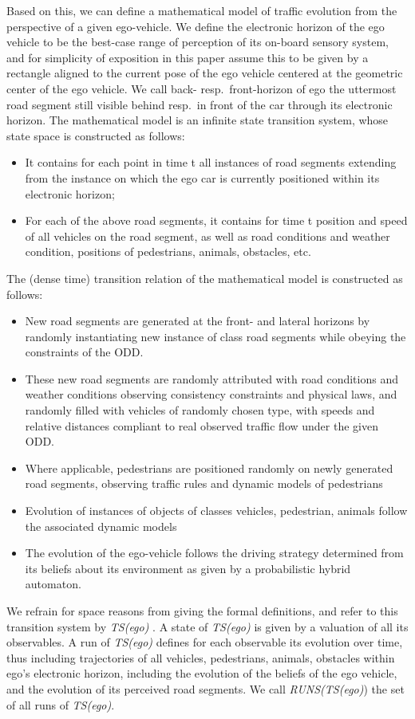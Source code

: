 Based on this, we can define a mathematical model of traffic evolution from the perspective of a given ego-vehicle. We define the electronic horizon of the ego vehicle to be the best-case range of perception of its on-board sensory system, and for simplicity of exposition in this paper assume this to be given by a rectangle aligned to the current pose of the ego vehicle centered at the geometric center of the ego vehicle. We call back- resp.\  front-horizon of ego the uttermost road segment still visible behind resp.\ in front of the car through its electronic horizon. The mathematical model is an infinite state transition system, whose state space is constructed as follows:
\begin{itemize}
\item It contains for each point in time t  all instances of road segments extending from the instance on which the ego car is currently positioned within its electronic horizon;
\item For each of the above road segments, it contains for time t  position and speed of all vehicles on the road segment, as well as road conditions and weather condition, positions of pedestrians, animals, obstacles, etc.
\end{itemize}
The (dense time) transition relation of the mathematical model is constructed as follows:
\begin{itemize}
\item New road segments are generated at the front- and lateral horizons by randomly instantiating new instance of class road segments while obeying the constraints of the ODD.
\item These new road segments are randomly attributed with road conditions and weather conditions observing consistency constraints and physical laws, and randomly filled with vehicles of randomly chosen type, with speeds and relative distances compliant to real observed traffic flow under the given ODD.
\item Where applicable, pedestrians are positioned randomly on newly generated road segments, observing traffic rules and dynamic models of pedestrians
\item Evolution of instances of objects of classes vehicles, pedestrian, animals follow the associated dynamic models
\item The evolution of the ego-vehicle follows the driving strategy determined from its beliefs about its environment as given by a probabilistic hybrid automaton.
\end{itemize}
We refrain for space reasons from giving the formal definitions, and refer to this transition system by \textit{TS(ego)} . A state of \textit{TS(ego)} is given by a valuation of all its observables. A run of \textit{TS(ego)} defines for each observable its evolution over time, thus including trajectories of all vehicles, pedestrians, animals, obstacles within ego's electronic horizon, including the evolution of the beliefs of the ego vehicle, and the evolution of its perceived road segments. We call \textit{RUNS(TS(ego)}) the set of all runs of \textit{TS(ego)}.

